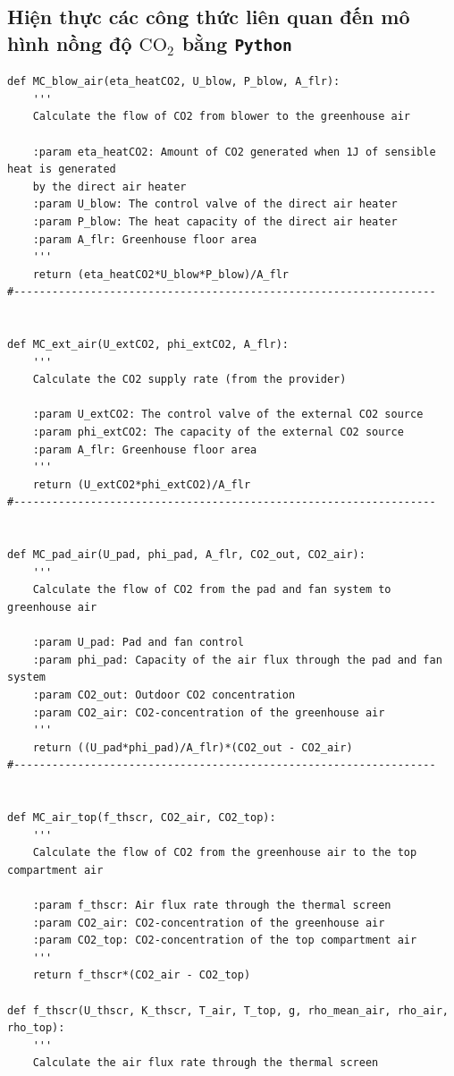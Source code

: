 \documentclass[a4paper]{article}
\begin{document}
\newpage
\begin{appendices}
\section{Hiện thực các công thức liên quan đến mô hình nồng độ $\mathrm{CO_2}$ bằng \texttt{Python}}\label{appendixA}
\begin{verbatim}
def MC_blow_air(eta_heatCO2, U_blow, P_blow, A_flr):
    '''
    Calculate the flow of CO2 from blower to the greenhouse air

    :param eta_heatCO2: Amount of CO2 generated when 1J of sensible heat is generated
    by the direct air heater
    :param U_blow: The control valve of the direct air heater
    :param P_blow: The heat capacity of the direct air heater
    :param A_flr: Greenhouse floor area
    '''
    return (eta_heatCO2*U_blow*P_blow)/A_flr
#------------------------------------------------------------------


def MC_ext_air(U_extCO2, phi_extCO2, A_flr):
    '''
    Calculate the CO2 supply rate (from the provider)

    :param U_extCO2: The control valve of the external CO2 source
    :param phi_extCO2: The capacity of the external CO2 source
    :param A_flr: Greenhouse floor area
    '''
    return (U_extCO2*phi_extCO2)/A_flr
#------------------------------------------------------------------


def MC_pad_air(U_pad, phi_pad, A_flr, CO2_out, CO2_air):
    '''
    Calculate the flow of CO2 from the pad and fan system to greenhouse air

    :param U_pad: Pad and fan control
    :param phi_pad: Capacity of the air flux through the pad and fan system
    :param CO2_out: Outdoor CO2 concentration
    :param CO2_air: CO2-concentration of the greenhouse air
    '''
    return ((U_pad*phi_pad)/A_flr)*(CO2_out - CO2_air)
#------------------------------------------------------------------


def MC_air_top(f_thscr, CO2_air, CO2_top):
    '''
    Calculate the flow of CO2 from the greenhouse air to the top compartment air

    :param f_thscr: Air flux rate through the thermal screen
    :param CO2_air: CO2-concentration of the greenhouse air
    :param CO2_top: CO2-concentration of the top compartment air
    '''
    return f_thscr*(CO2_air - CO2_top)
    
def f_thscr(U_thscr, K_thscr, T_air, T_top, g, rho_mean_air, rho_air, rho_top):
    '''
    Calculate the air flux rate through the thermal screen


\end{verbatim}
\end{appendices}
\end{document}
